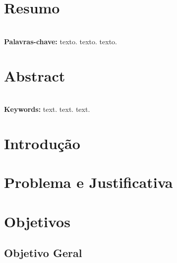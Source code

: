 \documentclass[a4paper, 11pt]{article}
\begin{document}




\clearpage
{}

\newpage
\section*{Resumo}

\lipsum[1] \\

\textbf{Palavras-chave:} texto. texto. texto.



\vspace{3cm}
\section*{Abstract}

\lipsum[1] \\

\textbf{Keywords:} text. text. text.




\newpage
\section{Introdução}

\lipsum[1-12]



\newpage
\section{Problema e Justificativa}

\lipsum[1-8]



\newpage
\section{Objetivos}

\vspace{1cm}
\subsection{Objetivo Geral}

\lipsum[1-5]
\end{document}
